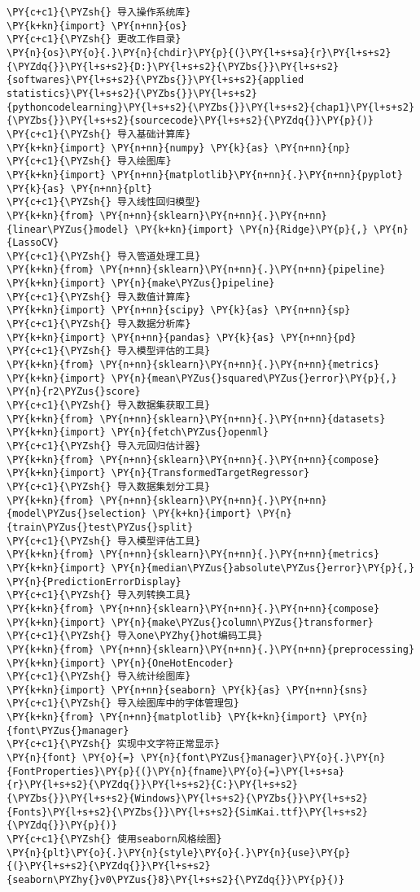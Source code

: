 \begin{Verbatim}[commandchars=\\\{\}]
\PY{c+c1}{\PYZsh{} 导入操作系统库}
\PY{k+kn}{import} \PY{n+nn}{os}
\PY{c+c1}{\PYZsh{} 更改工作目录}
\PY{n}{os}\PY{o}{.}\PY{n}{chdir}\PY{p}{(}\PY{l+s+sa}{r}\PY{l+s+s2}{\PYZdq{}}\PY{l+s+s2}{D:}\PY{l+s+s2}{\PYZbs{}}\PY{l+s+s2}{softwares}\PY{l+s+s2}{\PYZbs{}}\PY{l+s+s2}{applied statistics}\PY{l+s+s2}{\PYZbs{}}\PY{l+s+s2}{pythoncodelearning}\PY{l+s+s2}{\PYZbs{}}\PY{l+s+s2}{chap1}\PY{l+s+s2}{\PYZbs{}}\PY{l+s+s2}{sourcecode}\PY{l+s+s2}{\PYZdq{}}\PY{p}{)}
\PY{c+c1}{\PYZsh{} 导入基础计算库}
\PY{k+kn}{import} \PY{n+nn}{numpy} \PY{k}{as} \PY{n+nn}{np}
\PY{c+c1}{\PYZsh{} 导入绘图库}
\PY{k+kn}{import} \PY{n+nn}{matplotlib}\PY{n+nn}{.}\PY{n+nn}{pyplot} \PY{k}{as} \PY{n+nn}{plt}
\PY{c+c1}{\PYZsh{} 导入线性回归模型}
\PY{k+kn}{from} \PY{n+nn}{sklearn}\PY{n+nn}{.}\PY{n+nn}{linear\PYZus{}model} \PY{k+kn}{import} \PY{n}{Ridge}\PY{p}{,} \PY{n}{LassoCV}
\PY{c+c1}{\PYZsh{} 导入管道处理工具}
\PY{k+kn}{from} \PY{n+nn}{sklearn}\PY{n+nn}{.}\PY{n+nn}{pipeline} \PY{k+kn}{import} \PY{n}{make\PYZus{}pipeline}
\PY{c+c1}{\PYZsh{} 导入数值计算库}
\PY{k+kn}{import} \PY{n+nn}{scipy} \PY{k}{as} \PY{n+nn}{sp}
\PY{c+c1}{\PYZsh{} 导入数据分析库}
\PY{k+kn}{import} \PY{n+nn}{pandas} \PY{k}{as} \PY{n+nn}{pd}
\PY{c+c1}{\PYZsh{} 导入模型评估的工具}
\PY{k+kn}{from} \PY{n+nn}{sklearn}\PY{n+nn}{.}\PY{n+nn}{metrics} \PY{k+kn}{import} \PY{n}{mean\PYZus{}squared\PYZus{}error}\PY{p}{,} \PY{n}{r2\PYZus{}score}
\PY{c+c1}{\PYZsh{} 导入数据集获取工具}
\PY{k+kn}{from} \PY{n+nn}{sklearn}\PY{n+nn}{.}\PY{n+nn}{datasets} \PY{k+kn}{import} \PY{n}{fetch\PYZus{}openml}
\PY{c+c1}{\PYZsh{} 导入元回归估计器}
\PY{k+kn}{from} \PY{n+nn}{sklearn}\PY{n+nn}{.}\PY{n+nn}{compose} \PY{k+kn}{import} \PY{n}{TransformedTargetRegressor}
\PY{c+c1}{\PYZsh{} 导入数据集划分工具}
\PY{k+kn}{from} \PY{n+nn}{sklearn}\PY{n+nn}{.}\PY{n+nn}{model\PYZus{}selection} \PY{k+kn}{import} \PY{n}{train\PYZus{}test\PYZus{}split}
\PY{c+c1}{\PYZsh{} 导入模型评估工具}
\PY{k+kn}{from} \PY{n+nn}{sklearn}\PY{n+nn}{.}\PY{n+nn}{metrics} \PY{k+kn}{import} \PY{n}{median\PYZus{}absolute\PYZus{}error}\PY{p}{,} \PY{n}{PredictionErrorDisplay}
\PY{c+c1}{\PYZsh{} 导入列转换工具}
\PY{k+kn}{from} \PY{n+nn}{sklearn}\PY{n+nn}{.}\PY{n+nn}{compose} \PY{k+kn}{import} \PY{n}{make\PYZus{}column\PYZus{}transformer}
\PY{c+c1}{\PYZsh{} 导入one\PYZhy{}hot编码工具}
\PY{k+kn}{from} \PY{n+nn}{sklearn}\PY{n+nn}{.}\PY{n+nn}{preprocessing} \PY{k+kn}{import} \PY{n}{OneHotEncoder}
\PY{c+c1}{\PYZsh{} 导入统计绘图库}
\PY{k+kn}{import} \PY{n+nn}{seaborn} \PY{k}{as} \PY{n+nn}{sns}
\PY{c+c1}{\PYZsh{} 导入绘图库中的字体管理包}
\PY{k+kn}{from} \PY{n+nn}{matplotlib} \PY{k+kn}{import} \PY{n}{font\PYZus{}manager}
\PY{c+c1}{\PYZsh{} 实现中文字符正常显示}
\PY{n}{font} \PY{o}{=} \PY{n}{font\PYZus{}manager}\PY{o}{.}\PY{n}{FontProperties}\PY{p}{(}\PY{n}{fname}\PY{o}{=}\PY{l+s+sa}{r}\PY{l+s+s2}{\PYZdq{}}\PY{l+s+s2}{C:}\PY{l+s+s2}{\PYZbs{}}\PY{l+s+s2}{Windows}\PY{l+s+s2}{\PYZbs{}}\PY{l+s+s2}{Fonts}\PY{l+s+s2}{\PYZbs{}}\PY{l+s+s2}{SimKai.ttf}\PY{l+s+s2}{\PYZdq{}}\PY{p}{)}
\PY{c+c1}{\PYZsh{} 使用seaborn风格绘图}
\PY{n}{plt}\PY{o}{.}\PY{n}{style}\PY{o}{.}\PY{n}{use}\PY{p}{(}\PY{l+s+s2}{\PYZdq{}}\PY{l+s+s2}{seaborn\PYZhy{}v0\PYZus{}8}\PY{l+s+s2}{\PYZdq{}}\PY{p}{)}
\end{Verbatim}

